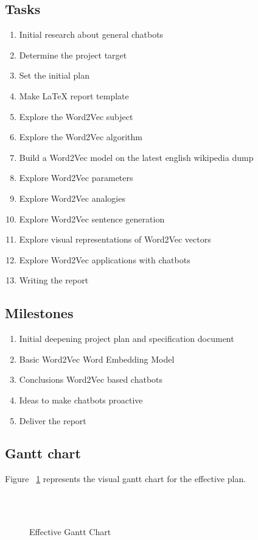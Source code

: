 \subsection{Tasks}
\begin{enumerate}
	\setlength\itemsep{0em}
	\item Initial research about general chatbots
	\item Determine the project target
	\item Set the initial plan
	\item Make LaTeX report template
	\item Explore the Word2Vec subject
	\item Explore the Word2Vec algorithm
	\item Build a Word2Vec model on the latest english wikipedia dump
	\item Explore Word2Vec parameters
	\item Explore Word2Vec analogies
	\item Explore Word2Vec sentence generation
	\item Explore visual representations of Word2Vec vectors
	\item Explore Word2Vec applications with chatbots
	\item Writing the report
	
\end{enumerate}

\subsection{Milestones}
\begin{enumerate}
	\setlength\itemsep{0em}
	\item Initial deepening project plan and specification document
	\item Basic Word2Vec Word Embedding Model
	\item Conclusions Word2Vec based chatbots
	\item Ideas to make chatbots proactive
	\item Deliver the report
\end{enumerate}

\subsection{Gantt chart}
Figure ~\ref{fig:gantt-effective} represents the visual gantt chart for the effective plan.

\begin{figure}[h]%
\centering
\begin{ganttchart}{1}{16}
\\
\\

\end{ganttchart}

\caption{Effective Gantt Chart}
\label{fig:gantt-effective}
\end{figure}
